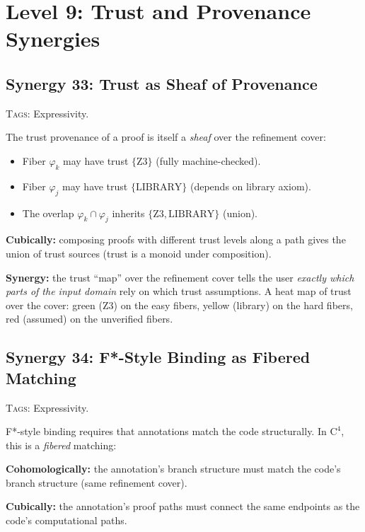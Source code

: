 \documentclass[11pt,a4paper]{article}
\theoremstyle{definition}
\theoremstyle{plain}
\begin{document}
\section{Level 9: Trust and Provenance Synergies}
\label{sec:syn-trust}


\subsection{Synergy 33: Trust as Sheaf of Provenance}
\label{sec:syn-trust-sheaf}

\textsc{Tags:} Expressivity.

\medskip\noindent
The trust provenance of a proof is itself a \emph{sheaf} over the
refinement cover:
\begin{itemize}
\item Fiber $\varphi_k$ may have trust $\{\mathrm{Z3}\}$ (fully
  machine-checked).
\item Fiber $\varphi_j$ may have trust $\{\mathrm{LIBRARY}\}$
  (depends on library axiom).
\item The overlap $\varphi_k \cap \varphi_j$ inherits
  $\{\mathrm{Z3}, \mathrm{LIBRARY}\}$ (union).
\end{itemize}

\textbf{Cubically:} composing proofs with different trust levels
along a path gives the union of trust sources (trust is a
monoid under composition).

\textbf{Synergy:} the trust ``map'' over the refinement cover tells
the user \emph{exactly which parts of the input domain} rely on
which trust assumptions.  A heat map of trust over the cover:
green (Z3) on the easy fibers, yellow (library) on the hard fibers,
red (assumed) on the unverified fibers.


\subsection{Synergy 34: F*-Style Binding as Fibered Matching}
\label{sec:syn-fstar-binding}

\textsc{Tags:} Expressivity.

\medskip\noindent
F*-style binding requires that annotations match the code
structurally.  In $\mathrm{C}^4$, this is a \emph{fibered} matching:

\textbf{Cohomologically:} the annotation's branch structure must
match the code's branch structure (same refinement cover).

\textbf{Cubically:} the annotation's proof paths must connect the
same endpoints as the code's computational paths.
\end{document}
